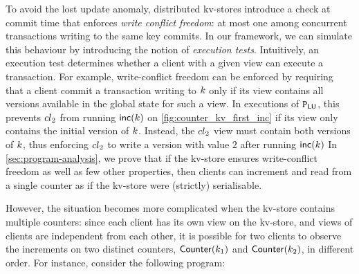 To avoid the lost update anomaly, distributed kv-stores introduce a check at commit time that enforces 
\emph{write conflict freedom}: at most one among concurrent transactions writing to the same key commits. 
In our framework, we can simulate this behaviour by introducing the notion of \emph{execution tests}. 
Intuitively, an execution test determines whether a client with a given view can execute a transaction. 
For example, write-conflict freedom can be enforced by requiring that a client commit a transaction writing to $k$ 
only if its view contains all versions available in the global state for such a view. 
In executions of $\mathtt{P}_{\mathsf{LU}}$,
this prevents ${cl}_2$ from running $\mathsf{inc}(k)$ on \cref{fig:counter_kv_first_inc}
if its view only contains the initial version of $k$. 
Instead, the ${cl}_2$ view must contain both versions of $k$, 
thus enforcing ${cl}_2$ to write a version with value $2$ after running $\mathsf{inc}(k)$
In \cref{sec:program-analysis}, we prove that if the kv-store 
ensures write-conflict freedom as well as few other properties, then clients can increment 
and read from a single counter as if the kv-store were (strictly) serialisable.

However, the situation becomes more complicated when the kv-store contains multiple counters:  
since each client has its own view on the kv-store, and views of clients are independent from each other, it is possible for two 
clients to observe the increments on two distinct counters, $\mathsf{Counter}(k_1)$ and $\mathsf{Counter}(k_2)$, in different order. 
For instance, consider the following program:

